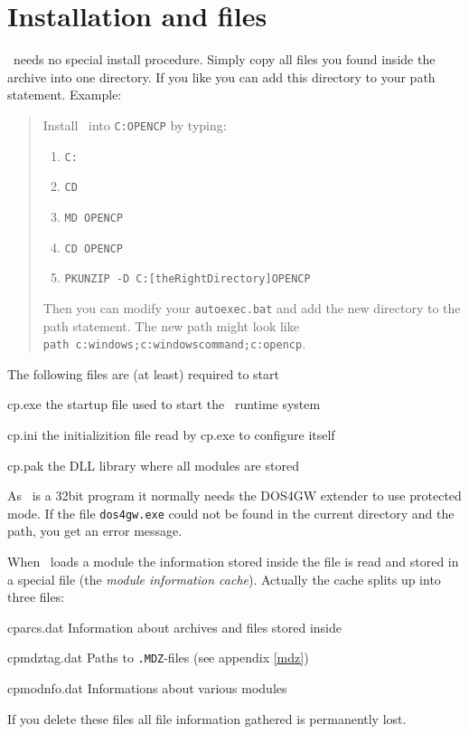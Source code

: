 %
%

\chapter{Installation and files}
\cp\ needs no special install procedure. Simply copy all files you found inside
the archive into one directory. If you like you can add this directory to your
path statement. Example:
\begin{quote}
Install \cp\ into \texttt{C:OPENCP} by typing:
\begin{enumerate}
\item \texttt{C:}
\item \texttt{CD }
\item \texttt{MD OPENCP}
\item \texttt{CD OPENCP}
\item \texttt{PKUNZIP -D C:[theRightDirectory]OPENCP}
\end{enumerate}
Then you can modify your \texttt{autoexec.bat} and add the new directory to
the path statement. The new path might look like \\
\texttt{path c:windows;c:windowscommand;c:opencp}.
\end{quote}

The following files are (at least) required to start \cp\ 
\begin{dojlist}
\item[cp.exe] the startup file used to start the \cp\ runtime system 
\item[cp.ini] the initializition file read by cp.exe to configure itself 
\item[cp.pak] the DLL library where all modules are stored 
\end{dojlist}

As \cp\ is a 32bit program it normally needs the DOS4GW extender to use
protected mode. If the file \texttt{dos4gw.exe} could not be found in the
current directory and the path, you get an error message.

When \cp\ loads a module the information stored inside the file is read and
stored in a special file (the \emph{module information cache}). Actually the
cache splits up into three files: 
\begin{dojlist}
\item[cparcs.dat] Information about archives and files stored inside 
\item[cpmdztag.dat] Paths to \texttt{.MDZ}-files (see appendix \ref{mdz})
\item[cpmodnfo.dat] Informations about various modules 
\end{dojlist}
If you delete these files all file information gathered is permanently lost.

